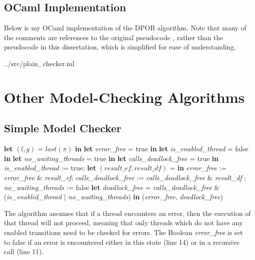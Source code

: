 \documentclass[12pt,a4paper,twoside,openany]{report}
\newcommand{\Let}[2]{\State \textbf{let} #1 = #2 \textbf{in}}
\begin{document}
\section{OCaml Implementation}
\label{sapp:dpor-imp}
Below is my OCaml implementation of the DPOR
algorithm. Note that many of the comments are
references to the original pseudocode
\cite[Figures~3--5]{flan05}, rather than the
pseudocode in this dissertation, which is
simplified for ease of understanding.


{../src/plain_checker.ml}

\chapter{Other Model-Checking Algorithms}
\label{app:pseudocode}
\section{Simple Model Checker}
\label{sapp:simple-code}
\begin{algorithmic}[1]
	\Let{$(l, g)$}
	{$\textit{last}(\pi)$}
	\Let{\textit{error\_free}}{true}
	\Let{\textit{is\_enabled\_thread}}{false}
	\Let{\textit{no\_waiting\_threads}}{true}
	\Let{\textit{calls\_deadlock\_free}}{true}
	\State \textit{is\_enabled\_thread} := true;
	\Let{$(\textit{result\_ef}, \textit{result\_df})$}
	{\Call{Check}{$\sigma_0, \pi.\textit{next}(\sigma, p)$}}
	\State \textit{error\_free} := \textit{error\_free}
	\& \textit{result\_ef};
	\State \textit{calls\_deadlock\_free}
	:= \textit{calls\_deadlock\_free}
	\& \textit{result\_df}
	\Else
	;
	\EndIf
	{\textit{no\_waiting\_threads} := false}
	\EndIf
	\EndIf
	\EndFor
	\Let{\textit{deadlock\_free}}{\textit{calls\_deadlock\_free} \&
		(\textit{is\_enabled\_thread} | \textit{no\_waiting\_threads})}
	\State \Return (\textit{error\_free}, \textit{deadlock\_free})
	\EndProcedure
\end{algorithmic}

The algorithm assumes that if a thread
encounters an error, then the execution
of that thread will not proceed, meaning
that only threads which do not have any
enabled transitions need to be checked
for errors. The Boolean \textit{error\_free}
is set to false if an error is encountered
either in this state (line 14) or in a
recursive call (line 11).
\end{document}
